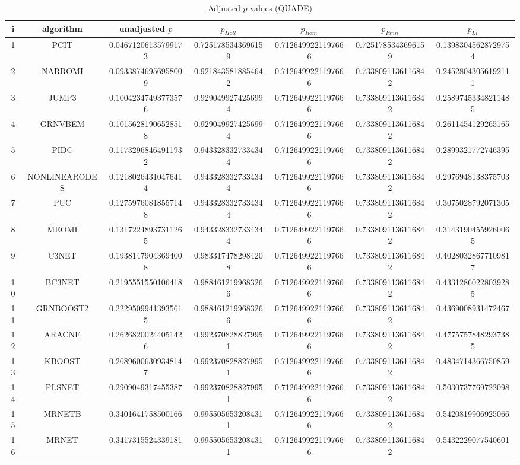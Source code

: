 \documentclass[a4paper,10pt]{article}
\begin{document}
\begin{landscape}
\begin{table}[!htp]
\centering\scriptsize
\caption{Adjusted $p$-values (QUADE)}
\begin{tabular}{ccccccc}
i&algorithm&unadjusted $p$&$p_{Holl}$&$p_{Rom}$&$p_{Finn}$&$p_{Li}$\\
\hline
1&PCIT&0.04671206135799173&0.7251785343696159&0.7126499221197666&0.7251785343696159&0.13983045628729754\\
2&NARROMI&0.09338746956958009&0.9218435818854642&0.7126499221197666&0.7338091136116842&0.24528043056192111\\
3&JUMP3&0.10042347493773576&0.9290499274256994&0.7126499221197666&0.7338091136116842&0.25897453348211485\\
4&GRNVBEM&0.10156281906528518&0.9290499274256994&0.7126499221197666&0.7338091136116842&0.2611454129265165\\
5&PIDC&0.11732968464911932&0.9433283327334344&0.7126499221197666&0.7338091136116842&0.2899321772746395\\
6&NONLINEARODES&0.12180264310476414&0.9433283327334344&0.7126499221197666&0.7338091136116842&0.2976948138375703\\
7&PUC&0.12759760818557148&0.9433283327334344&0.7126499221197666&0.7338091136116842&0.3075028792071305\\
8&MEOMI&0.13172248937311265&0.9433283327334344&0.7126499221197666&0.7338091136116842&0.31431904559260065\\
9&C3NET&0.19381479043694008&0.9833174782984208&0.7126499221197666&0.7338091136116842&0.40280328677109817\\
10&BC3NET&0.2195551550106418&0.9884612199683266&0.7126499221197666&0.7338091136116842&0.43312860228039285\\
11&GRNBOOST2&0.22295099413935615&0.9884612199683266&0.7126499221197666&0.7338091136116842&0.4369008931472467\\
12&ARACNE&0.26268200244051426&0.9923708288279951&0.7126499221197666&0.7338091136116842&0.47757578482937385\\
13&KBOOST&0.26896006309348147&0.9923708288279951&0.7126499221197666&0.7338091136116842&0.4834714366750859\\
14&PLSNET&0.2909049317455387&0.9923708288279951&0.7126499221197666&0.7338091136116842&0.5030737769722098\\
15&MRNETB&0.3401641758500166&0.9955056532084311&0.7126499221197666&0.7338091136116842&0.5420819906925066\\
16&MRNET&0.3417315524339181&0.9955056532084311&0.7126499221197666&0.7338091136116842&0.5432229077540601\\

\end{tabular}
\end{table}
\end{landscape}
\end{document}
